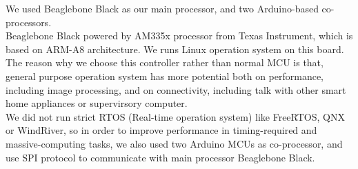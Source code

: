 We used Beaglebone Black as our main processor, and two Arduino-based co-processors. \\
Beaglebone Black powered by AM335x processor from Texas Instrument, which is based on ARM-A8 architecture. We runs Linux operation system on this board. The reason why we choose this controller rather than normal MCU is that, general purpose operation system has more potential both on performance, including image processing, and on connectivity, including talk with other smart home appliances or supervirsory computer. \\
We did not run strict RTOS (Real-time operation system) like FreeRTOS, QNX or WindRiver, so in order to improve performance in timing-required and massive-computing tasks, we also used two Arduino MCUs as co-processor, and use SPI protocol to communicate with main processor Beaglebone Black.  \\
